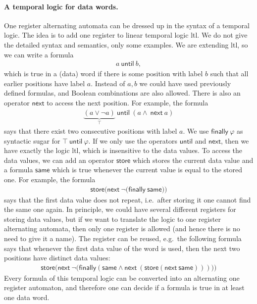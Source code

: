 \paragraph*{A temporal logic for data words.} 
One register alternating automata can be dressed up in the syntax of a temporal logic. The idea is to add one register to linear temporal logic {\sc ltl}. We do not give the detailed syntax and semantics, only some examples. We are extending {\sc ltl}, so we can write a formula 
\begin{align*}
 a \ \mathsf{until}\ b,
\end{align*}
which is true in a (data) word if there is some position with label $b$ such that all earlier positions have label $a$. Instead of $a,b$ we could have used previously defined formulas, and Boolean combinations are also allowed. There is also an operator $\mathsf{next}$ to access the next position. For example, the formula 
\begin{align*}
 \underbrace{(a \lor \neg a)}_{\top} \ \mathsf{until}\ (a \land \ \mathsf{next} \ a)
\end{align*}
says that there exist two consecutive positions with label $a$. We use $\mathsf{finally}\ \varphi$ as syntactic sugar for $\top\ \mathsf{until}\ \varphi$. If we only use the operators $\mathsf{until}$ and $\mathsf{next}$, then we have exactly the logic {\sc ltl}, which is insensitive to the data values. To access the data values, we can add an operator $\mathsf{store}$ which stores the current data value and a formula $\mathsf{same}$ which is true whenever the current value is equal to the stored one. For example, the formula
\begin{align*}
 \mathsf{store}\big( \mathsf{next}\ \neg \big(\mathsf{finally \ same} )\big)
\end{align*}
says that the first data value does not repeat, i.e.~after storing it one cannot find the same one again. In principle, we could have several different registers for storing data values, but if we want to translate the logic to one register alternating automata, then only one register is allowed (and hence there is no need to give it a name). The register can be reused, e.g.~the following formula says that whenever the first data value of the word is used, then the next two positions have distinct data values:
\begin{align*}
 \mathsf{store}\big( \mathsf{next}\ \neg \big(\mathsf{finally} (\mathsf{same} \land \mathsf{next}\ (\mathsf{store} (\mathsf{next} \ \mathsf{same}) ) )\big) \big)
\end{align*}
Every formula of this temporal logic can be converted into an alternating one register automaton, and therefore one can decide if a formula is true in at least one data word.

